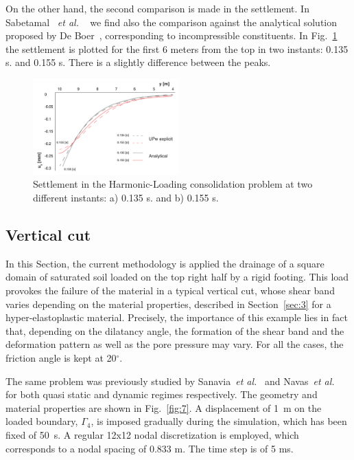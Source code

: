 \documentclass[twocolumn]{svjour3}          %
\newcommand{\etal}{
  \textit{et al.}
}
\begin{document}
On the other hand, the second comparison is made in the settlement. In Sabetamal~\etal~\cite{Sabetamal:2015} we find also the comparison against the analytical solution proposed by De Boer~\cite{deBoer:93}, corresponding to incompressible constituents. In Fig.~\ref{fig_con6} the settlement is plotted for the first 6 meters from the top in two instants: 0.135 s. and 0.155 s. There is a slightly difference between the peaks.

\begin{figure}
\begin{center}
\includegraphics[width=0.5\textwidth]{Fig/fig_disp.pdf}
\caption{Settlement in the Harmonic-Loading consolidation problem at two different instants: a) 0.135 s. and b) 0.155 s.}
\label{fig_con6}
\end{center}
\end{figure}

\subsection{Vertical cut}
\label{sec:5:2}
In this Section, the current methodology is applied the drainage of a square domain of saturated soil loaded on the top right half by a rigid footing. This load provokes the failure of the material in a typical vertical cut, whose shear band varies depending on the material properties, described in Section~\ref{sec:3} for a hyper-elastoplastic material. Precisely, the importance of this example lies in fact that, depending on the dilatancy angle, the formation of the shear band and the deformation pattern as well as the pore pressure may vary. For all the cases,  the  friction angle is kept at 20$^\circ$. 

The same problem was previously studied by Sanavia~\textit{et al.}~\cite{Sanavia:01,Sanavia:02b} and Navas~\textit{et al.}~\cite{Navas:17b,Navas:17c} for both quasi static and dynamic regimes respectively. The geometry and material properties are shown in Fig.~\ref{fig:7}. A displacement of 1~m on the loaded boundary, $\Gamma_4$, is imposed  gradually during the simulation, which has been fixed of 50~s. A regular 12x12 nodal discretization is employed, which corresponds to a nodal spacing of 0.833 m. The time step is of 5 ms.
\end{document}

